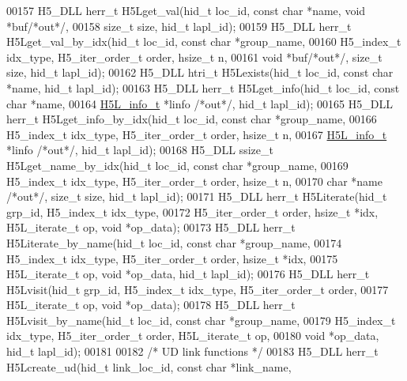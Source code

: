 \begin{DoxyCode}
00157 H5\_DLL herr\_t H5Lget\_val(hid\_t loc\_id, \textcolor{keyword}{const} \textcolor{keywordtype}{char} *name, \textcolor{keywordtype}{void} *buf\textcolor{comment}{/*out*/},
00158     \textcolor{keywordtype}{size\_t} size, hid\_t lapl\_id);
00159 H5\_DLL herr\_t H5Lget\_val\_by\_idx(hid\_t loc\_id, \textcolor{keyword}{const} \textcolor{keywordtype}{char} *group\_name,
00160     H5\_index\_t idx\_type, H5\_iter\_order\_t order, hsize\_t n,
00161     \textcolor{keywordtype}{void} *buf\textcolor{comment}{/*out*/}, \textcolor{keywordtype}{size\_t} size, hid\_t lapl\_id);
00162 H5\_DLL htri\_t H5Lexists(hid\_t loc\_id, \textcolor{keyword}{const} \textcolor{keywordtype}{char} *name, hid\_t lapl\_id);
00163 H5\_DLL herr\_t H5Lget\_info(hid\_t loc\_id, \textcolor{keyword}{const} \textcolor{keywordtype}{char} *name,
00164     \hyperlink{struct_h5_l__info__t}{H5L\_info\_t} *linfo \textcolor{comment}{/*out*/}, hid\_t lapl\_id);
00165 H5\_DLL herr\_t H5Lget\_info\_by\_idx(hid\_t loc\_id, \textcolor{keyword}{const} \textcolor{keywordtype}{char} *group\_name,
00166     H5\_index\_t idx\_type, H5\_iter\_order\_t order, hsize\_t n,
00167     \hyperlink{struct_h5_l__info__t}{H5L\_info\_t} *linfo \textcolor{comment}{/*out*/}, hid\_t lapl\_id);
00168 H5\_DLL ssize\_t H5Lget\_name\_by\_idx(hid\_t loc\_id, \textcolor{keyword}{const} \textcolor{keywordtype}{char} *group\_name,
00169     H5\_index\_t idx\_type, H5\_iter\_order\_t order, hsize\_t n,
00170     \textcolor{keywordtype}{char} *name \textcolor{comment}{/*out*/}, \textcolor{keywordtype}{size\_t} size, hid\_t lapl\_id);
00171 H5\_DLL herr\_t H5Literate(hid\_t grp\_id, H5\_index\_t idx\_type,
00172     H5\_iter\_order\_t order, hsize\_t *idx, H5L\_iterate\_t op, \textcolor{keywordtype}{void} *op\_data);
00173 H5\_DLL herr\_t H5Literate\_by\_name(hid\_t loc\_id, \textcolor{keyword}{const} \textcolor{keywordtype}{char} *group\_name,
00174     H5\_index\_t idx\_type, H5\_iter\_order\_t order, hsize\_t *idx,
00175     H5L\_iterate\_t op, \textcolor{keywordtype}{void} *op\_data, hid\_t lapl\_id);
00176 H5\_DLL herr\_t H5Lvisit(hid\_t grp\_id, H5\_index\_t idx\_type, H5\_iter\_order\_t order,
00177     H5L\_iterate\_t op, \textcolor{keywordtype}{void} *op\_data);
00178 H5\_DLL herr\_t H5Lvisit\_by\_name(hid\_t loc\_id, \textcolor{keyword}{const} \textcolor{keywordtype}{char} *group\_name,
00179     H5\_index\_t idx\_type, H5\_iter\_order\_t order, H5L\_iterate\_t op,
00180     \textcolor{keywordtype}{void} *op\_data, hid\_t lapl\_id);
00181 
00182 \textcolor{comment}{/* UD link functions */}
00183 H5\_DLL herr\_t H5Lcreate\_ud(hid\_t link\_loc\_id, \textcolor{keyword}{const} \textcolor{keywordtype}{char} *link\_name,

\end{DoxyCode}
